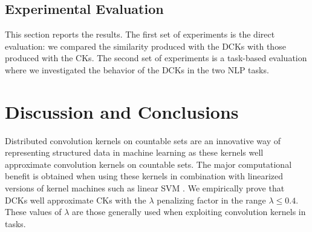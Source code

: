 \documentclass[twoside,11pt]{article}
\def\comment#1#2{}
\begin{document}
\subsection{Experimental Evaluation}
\label{sec:eval}

This section reports the results. The first set of experiments is the direct evaluation: we compared the similarity produced with the DCKs with those produced with the CKs. The second set of experiments is a task-based evaluation where we investigated the behavior of the DCKs in the two NLP tasks.


\section{Discussion and Conclusions\comment{REVISED}{}}
\label{sec:conclusions}

\comment{[R2,C4][IssueD]}{The bottom line is that, when reaching the (non-existing) conclusion, the reader is confused and do not 
know when and how to use DTK. Are they a good approximation of TK? Even when they are not such a 
good approximation, are there better than other approaches? Shall we only use small lambdas or not? 
It is essential to remove/explain the contradictions, connect the theory and the experiments, and offer a 
"take-home" message to the reader for when to use DTK. I am convinced the paper contains nearly all 
the needed material to achieve that, and this is mostly a question of proper write-up.
}
Distributed convolution kernels on countable sets are an innovative way of representing structured data in machine learning as these kernels well approximate convolution kernels on countable sets. The major computational benefit is obtained when using these kernels in combination with linearized versions of kernel machines such as linear SVM \cite{Joachims:2006:TLS:1150402.1150429,DBLP:journals/mp/Shalev-ShwartzSSC11}. We empirically prove that DCKs well approximate CKs with the $\lambda$ penalizing factor in the range $\lambda \leq 0.4$. These values of $\lambda$ are those generally used when exploiting convolution kernels in tasks.
\end{document}
